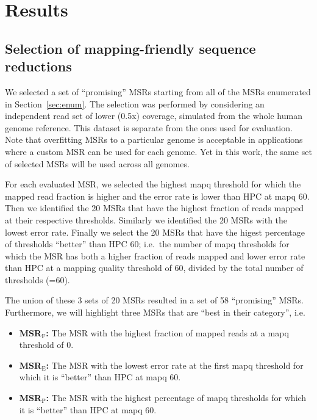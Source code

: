 \documentclass[
  11,
]{scrbook}
\begin{document}
\hypertarget{results-1}{%
\section{Results}\label{results-1}}

\hypertarget{selection-of-mapping-friendly-sequence-reductions}{%
\subsection{Selection of mapping-friendly sequence reductions}\label{selection-of-mapping-friendly-sequence-reductions}}

We selected a set of ``promising'' MSRs starting from all of the MSRs
enumerated in Section~\ref{sec:enum}. The selection was performed by considering an
independent read set of lower (0.5x) coverage, simulated from the whole
human genome reference. This dataset is separate from the ones used for
evaluation. Note that overfitting MSRs to a particular genome is
acceptable in applications where a custom MSR can be used for each
genome. Yet in this work, the same set of selected MSRs will be used
across all genomes.

For each evaluated MSR, we selected the highest mapq threshold for which
the mapped read fraction is higher and the error rate is lower than HPC
at mapq 60. Then we identified the 20 MSRs that have the highest
fraction of reads mapped at their respective thresholds. Similarly we
identified the 20 MSRs with the lowest error rate. Finally we select the
20 MSRs that have the higest percentage of thresholds ``better'' than HPC
60; i.e.~the number of mapq thresholds for which the MSR has both a
higher fraction of reads mapped and lower error rate than HPC at a
mapping quality threshold of 60, divided by the total number of
thresholds (=60).

The union of these 3 sets of 20 MSRs resulted in
a set of 58 ``promising'' MSRs. Furthermore, we will highlight three MSRs
that are ``best in their category'', i.e.

\begin{itemize}
\item
  \textbf{MSR\(_{\text{F}}\):} The MSR with the highest fraction of mapped
  reads at a mapq threshold of 0.
\item
  \textbf{MSR\(_{\text{E}}\):} The MSR with the lowest error rate at the
  first mapq threshold for which it is ``better'' than HPC at mapq 60.
\item
  \textbf{MSR\(_{\text{P}}\):} The MSR with the highest percentage of mapq
  thresholds for which it is ``better'' than HPC at mapq 60.
\end{itemize}
\end{document}
